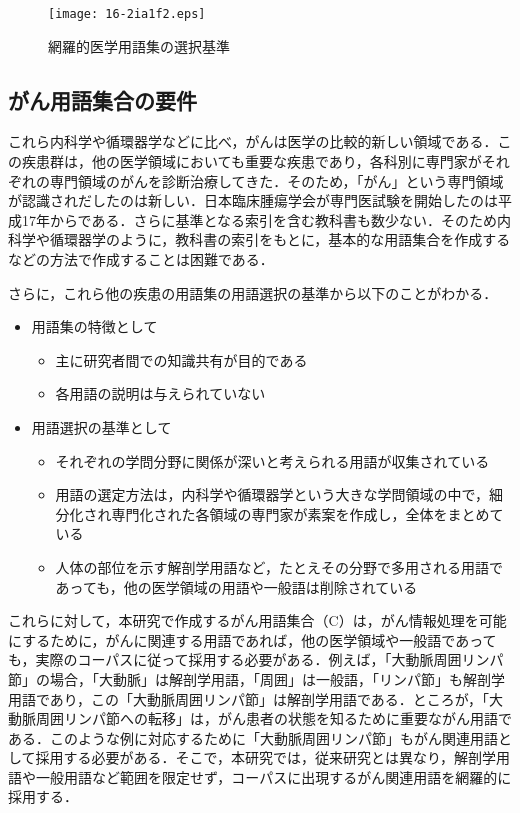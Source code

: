 \documentclass[japanese]{jnlp_1.4}
\begin{document}
\begin{figure}[t]
 \begin{center}
  \texttt{[image: 16-2ia1f2.eps]}
 \end{center}
 \caption{網羅的医学用語集の選択基準}
 \label{f:002}
\end{figure}


\subsection{がん用語集合の要件}
\label{s:がん用語集合の要件}

これら内科学や循環器学などに比べ，がんは医学の比較的新しい領域である．この疾患群は，他の医学領域においても重要な疾患であり，各科別に専門家がそれぞれの専門領域のがんを診断治療してきた．そのため，「がん」という専門領域が認識されだしたのは新しい．日本臨床腫瘍学会が専門医試験を開始したのは平成17年からである．さらに基準となる索引を含む教科書も数少ない．そのため内科学や循環器学のように，教科書の索引をもとに，基本的な用語集合を作成するなどの方法で作成することは困難である．

さらに，これら他の疾患の用語集の用語選択の基準から以下のことがわかる．

\begin{itemize}
 \item 用語集の特徴として
 \begin{itemize}
  \item 主に研究者間での知識共有が目的である
  \item 各用語の説明は与えられていない
 \end{itemize}
 \item 用語選択の基準として
 \begin{itemize}
  \item それぞれの学問分野に関係が深いと考えられる用語が収集されている
  \item 用語の選定方法は，内科学や循環器学という大きな学問領域の中で，細分化され専門化された各領域の専門家が素案を作成し，全体をまとめている
  \item 人体の部位を示す解剖学用語など，たとえその分野で多用される用語であっても，他の医学領域の用語や一般語は削除されている
 \end{itemize}
\end{itemize}

これらに対して，本研究で作成するがん用語集合（C）は，がん情報処理を可能にするために，がんに関連する用語であれば，他の医学領域や一般語であっても，実際のコーパスに従って採用する必要がある．例えば，「大動脈周囲リンパ節」の場合，「大動脈」は解剖学用語，「周囲」は一般語，「リンパ節」も解剖学用語であり，この「大動脈周囲リンパ節」は解剖学用語である．ところが，「大動脈周囲リンパ節への転移」は，がん患者の状態を知るために重要ながん用語である．このような例に対応するために「大動脈周囲リンパ節」もがん関連用語として採用する必要がある．そこで，本研究では，従来研究とは異なり，解剖学用語や一般用語など範囲を限定せず，コーパスに出現するがん関連用語を網羅的に採用する．
\end{document}
